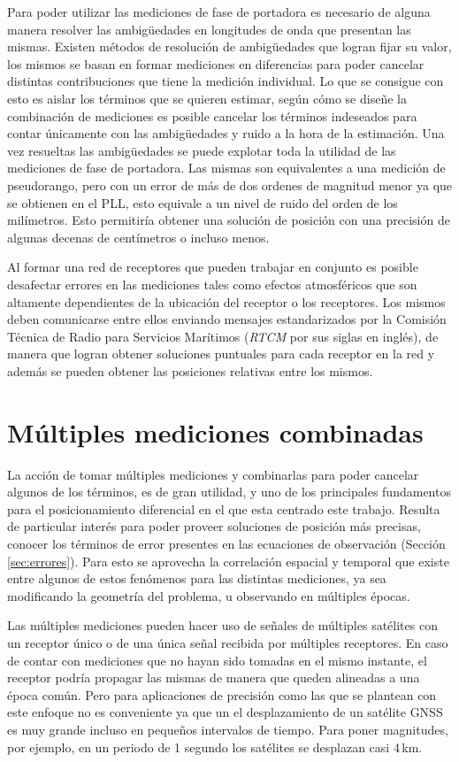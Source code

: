 \documentclass[a4paper,12pt,oneside,onecolumn,final,openright]{book}%
\begin{document}
	Para poder utilizar las mediciones de fase de portadora es necesario de alguna manera resolver las ambigüedades en longitudes de onda que presentan las mismas. Existen métodos de resolución de ambigüedades que logran fijar su valor, los mismos se basan en formar mediciones en diferencias para poder cancelar distintas contribuciones que tiene la medición individual. Lo que se consigue con esto es aislar los términos que se quieren estimar, según cómo se diseñe la combinación de mediciones es posible cancelar los términos indeseados para contar únicamente con las ambigüedades y ruido a la hora de la estimación. Una vez resueltas las ambigüedades se puede explotar toda la utilidad de las mediciones de fase de portadora. Las mismas son equivalentes a una medición de pseudorango, pero con un error de más de dos ordenes de magnitud menor ya que se obtienen en el PLL, esto equivale a un nivel de ruido del orden de los milímetros. Esto permitiría obtener una solución de posición con una precisión de algunas decenas de centímetros o incluso menos. 
	
	 Al formar una red de receptores que pueden trabajar en conjunto es posible desafectar errores en las mediciones tales como efectos atmosféricos que son altamente dependientes de la ubicación del receptor o los receptores.	Los mismos deben comunicarse entre ellos enviando mensajes estandarizados por la Comisión Técnica de Radio para Servicios Marítimos (\textit{RTCM} por sus siglas en inglés), de manera que logran obtener soluciones puntuales para cada receptor en la red y además se pueden obtener las posiciones relativas entre los mismos.

\section{Múltiples mediciones combinadas}\label{sec:multiples_mediciones}
	La acción de tomar múltiples mediciones y combinarlas para poder cancelar algunos de los términos, es de gran utilidad, y uno de los principales fundamentos para el posicionamiento diferencial en el que esta centrado este trabajo. Resulta de particular interés para poder proveer soluciones de posición más precisas, conocer los términos de error presentes en las ecuaciones de observación (Sección \ref{sec:errores}). Para esto se aprovecha la correlación espacial y temporal que existe entre algunos de estos fenómenos para las distintas mediciones, ya sea modificando la geometría del problema, u observando en múltiples épocas.
	
	Las múltiples mediciones pueden hacer uso de señales de múltiples satélites con un receptor único o de una única señal recibida por múltiples receptores. En caso de contar con mediciones que no hayan sido tomadas en el mismo instante, el receptor podría propagar las mismas de manera que queden alineadas a una época común. Pero para aplicaciones de precisión como las que se plantean con este enfoque no es conveniente ya que un el desplazamiento de un satélite GNSS es muy grande incluso en pequeños intervalos de tiempo. Para poner magnitudes, por ejemplo, en un periodo de 1 segundo los satélites se desplazan casi 4\,km.
\end{document}

